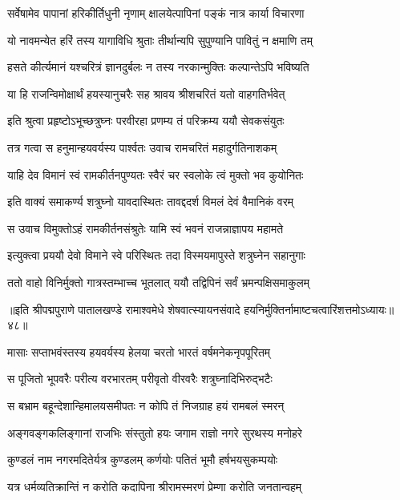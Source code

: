 \twolineshloka
{सर्वेषामेव पापानां हरिकीर्तिधुनी नृणाम्}
{क्षालयेत्पापिनां पङ्कं नात्र कार्या विचारणा}%

\twolineshloka
{यो नावमन्येत हरिं तस्य यागाविधि श्रुताः}
{तीर्थान्यपि सुपुण्यानि पावितुं न क्षमाणि तम्}%

\twolineshloka
{हसते कीर्त्यमानं यश्चरित्रं ज्ञानदुर्बलः}
{न तस्य नरकान्मुक्तिः कल्पान्तेऽपि भविष्यति}%

\twolineshloka
{या हि राजन्विमोक्षार्थं हयस्यानुचरैः सह}
{श्रावय श्रीशचरितं यतो वाहगतिर्भवेत्}%


\twolineshloka
{इति श्रुत्वा प्रहृष्टोऽभूच्छत्रुघ्नः परवीरहा}
{प्रणम्य तं परिक्रम्य ययौ सेवकसंयुतः}%

\twolineshloka
{तत्र गत्वा स हनुमान्हयवर्यस्य पार्श्वतः}
{उवाच रामचरितं महादुर्गतिनाशकम्}%

\twolineshloka
{याहि देव विमानं स्वं रामकीर्तनपुण्यतः}
{स्वैरं चर स्वलोके त्वं मुक्तो भव कुयोनितः}%

\twolineshloka
{इति वाक्यं समाकर्ण्य शत्रुघ्नो यावदास्थितः}
{तावद्ददर्श विमलं देवं वैमानिकं वरम्}%

\twolineshloka
{स उवाच विमुक्तोऽहं रामकीर्तनसंश्रुतेः}
{यामि स्वं भवनं राजन्नाज्ञापय महामते}%

\twolineshloka
{इत्युक्त्वा प्रययौ देवो विमाने स्वे परिस्थितः}
{तदा विस्मयमापुस्ते शत्रुघ्नेन सहानुगाः}%

\twolineshloka
{ततो वाहो विनिर्मुक्तो गात्रस्तम्भाच्च भूतलात्}
{ययौ तद्विपिनं सर्वं भ्रमन्पक्षिसमाकुलम्}%

॥इति श्रीपद्मपुराणे पातालखण्डे रामाश्वमेधे शेषवात्स्यायनसंवादे हयनिर्मुक्तिर्नामाष्टचत्वारिंशत्तमोऽध्यायः॥४८॥



\twolineshloka
{मासाः सप्ताभवंस्तस्य हयवर्यस्य हेलया}
{चरतो भारतं वर्षमनेकनृपपूरितम्}%

\twolineshloka
{स पूजितो भूपवरैः परीत्य वरभारतम्}
{परीवृतो वीरवरैः शत्रुघ्नादिभिरुद्भटैः}%

\twolineshloka
{स बभ्राम बहून्देशान्हिमालयसमीपतः}
{न कोपि तं निजग्राह हयं रामबलं स्मरन्}%

\twolineshloka
{अङ्गवङ्गकलिङ्गानां राजभिः संस्तुतो हयः}
{जगाम राज्ञो नगरे सुरथस्य मनोहरे}%

\twolineshloka
{कुण्डलं नाम नगरमदितेर्यत्र कुण्डलम्}
{कर्णयोः पतितं भूमौ हर्षभयसुकम्पयोः}%

\twolineshloka
{यत्र धर्मव्यतिक्रान्तिं न करोति कदापिना}
{श्रीरामस्मरणं प्रेम्णा करोति जनतान्वहम्}%

